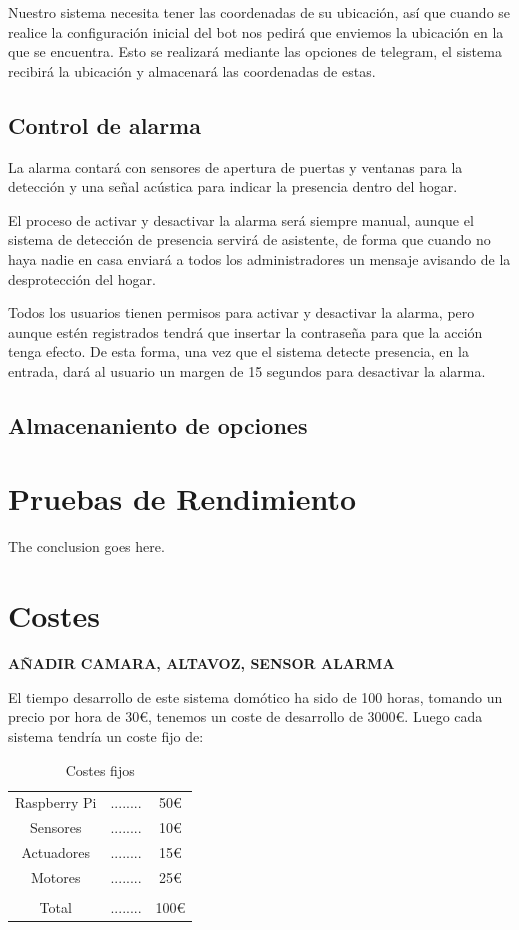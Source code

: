 \documentclass[10pt,journal,compsoc]{IEEEtran}
\begin{document}
Nuestro sistema necesita tener las coordenadas de su ubicación, así que cuando 
se realice la configuración inicial del bot nos pedirá que enviemos la ubicación 
en la que se encuentra. Esto se realizará mediante las opciones de telegram, el 
sistema recibirá la ubicación y almacenará las coordenadas de estas.

\subsection{Control de alarma}
La alarma contará con sensores de apertura de puertas y ventanas para la 
detección y una señal acústica para indicar la presencia dentro del hogar.

El proceso de activar y desactivar la alarma será siempre manual, aunque el 
sistema de detección de presencia servirá de asistente, de forma que cuando no 
haya nadie en casa enviará a todos los administradores un mensaje avisando de la 
desprotección del hogar. 

Todos los usuarios tienen permisos para activar y desactivar la alarma, pero 
aunque estén registrados tendrá que insertar la contraseña para que la acción 
tenga efecto. De esta forma, una vez que el sistema detecte presencia, en la 
entrada, dará al usuario un margen de 15 segundos para desactivar la alarma.

\subsection{Almacenaniento de opciones}

\section{Pruebas de Rendimiento}
The conclusion goes here.

\section{Costes}
\textbf{AÑADIR CAMARA,  ALTAVOZ, SENSOR ALARMA}

El tiempo desarrollo de este sistema domótico ha sido de 100 horas, 
tomando un precio por hora de 30\euro, 
tenemos un coste de desarrollo de 3000\euro.
Luego cada sistema tendría un coste fijo de:

\begin{table}[h]
\centering
\begin{tabular}{ccc}
Raspberry Pi & ........ & 50\euro \\
Sensores & ........ & 10\euro \\
Actuadores & ........ & 15\euro \\
Motores & ........ & 25\euro \\
\hline \\
Total & ........ & 100\euro \\
\end{tabular} 
\caption{Costes fijos}
\label{tab:CostesFij}
\end{table}
\end{document}
